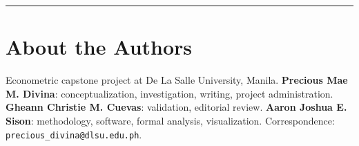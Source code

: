 \documentclass[10pt]{article}
\begin{document}
\vspace{0.15em}
\hrule
\vspace{0.15em}

%
%
\section*{About the Authors}

Econometric capstone project at De La Salle University, Manila. \textbf{Precious Mae M. Divina}: conceptualization, investigation, writing, project administration. \textbf{Gheann Christie M. Cuevas}: validation, editorial review. \textbf{Aaron Joshua E. Sison}: methodology, software, formal analysis, visualization. Correspondence: \texttt{precious\_divina@dlsu.edu.ph}.
\end{document}
